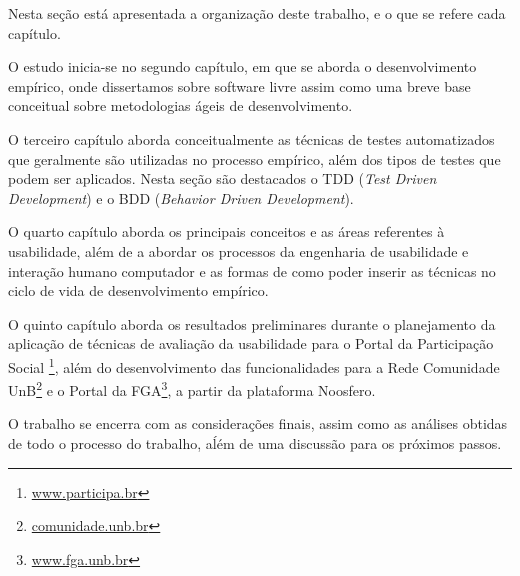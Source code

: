 Nesta seção está apresentada a organização deste trabalho, e o que se refere cada capítulo.
%

O estudo inicia-se no segundo capítulo, em que se aborda o desenvolvimento empírico, onde dissertamos sobre software livre assim como uma breve base conceitual sobre metodologias ágeis de desenvolvimento.

%
O terceiro capítulo aborda conceitualmente as técnicas de testes automatizados que geralmente são utilizadas no processo empírico, além dos tipos de testes que podem ser aplicados. Nesta seção são destacados o TDD (\textit{Test Driven Development}) e o BDD (\textit{Behavior Driven Development}).

%
O quarto capítulo aborda os principais conceitos e as áreas referentes à usabilidade, além de a abordar os processos da engenharia de usabilidade e interação humano computador e as formas de como poder inserir as técnicas no ciclo de vida de desenvolvimento empírico.

%
O quinto capítulo aborda os resultados preliminares durante o planejamento da aplicação de técnicas de avaliação da usabilidade para o Portal da Participação Social \footnote{\url{www.participa.br}}, além do desenvolvimento das funcionalidades para a Rede Comunidade UnB\footnote{\url{comunidade.unb.br}} e o Portal da FGA\footnote{\url{www.fga.unb.br}}, a partir da plataforma Noosfero.

O trabalho se encerra com as considerações finais, assim como as análises obtidas de todo o processo do trabalho, aĺém de uma discussão para os próximos passos.


